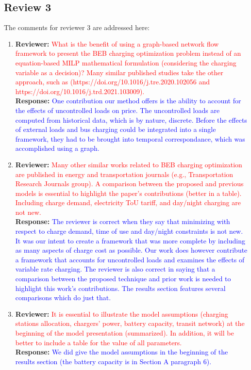 \documentclass{article}
\newcommand\formatfeedback[2]
{%
	\textbf{Reviewer:} \textcolor{red}{#1} 
	\leavevmode\\[0.1in] \textbf{Response:} \textcolor{blue}{#2}
}
\begin{document}
\subsection*{Review 3}
The comments for reviewer 3 are addressed here:
\begin{enumerate}
	\item  \formatfeedback{What is the benefit of using a graph-based network flow framework to present the BEB charging
optimization problem instead of an equation-based MILP mathematical formulation (considering
the charging variable as a decision)? Many similar published studies take the other approach, such
as (https://doi.org/10.1016/j.tre.2020.102056 and https://doi.org/10.1016/j.trd.2021.103009).}{One contribution our method offers is the ability to account for the effects of uncontrolled loads on price. The uncontrolled loads are computed from historical data, which is by nature, discrete. Before the effects of external loads and bus charging could be integrated into a single framework, they had to be brought into temporal correspondance, which was accomplished using a graph.}
	\item \formatfeedback{Many other similar works related to BEB charging optimization are published in energy and
transportation journals (e.g., Transportation Research Journals group). A comparison between the
proposed and previous models is essential to highlight the paper’s contributions (better in a table).
Including charge demand, electricity ToU tariff, and day/night charging are not new.}{The reviewer is correct when they say that minimizing with respect to charge demand, time of use and day/night constraints is not new. It was our intent to create a framework that was more complete by including as many aspects of charge cost as possible. Our work does however contribute a framework that accounts for uncontrolled loads and examines the effects of variable rate charging. The reviewer is also correct in saying that a comparison between the proposed technique and prior work is needed to highlight this work's contributions. The results section features several comparisons which do just that.}
	\item \formatfeedback{It is essential to illustrate the model assumptions (charging stations allocation, chargers’ power,
battery capacity, transit network) at the beginning of the model presentation (summarized). In
addition, it will be better to include a table for the value of all parameters.}{We did give the model assumptions in the beginning of the results section (the battery capacity is in Section A paragraph 6).}

\end{enumerate}
\end{document}
